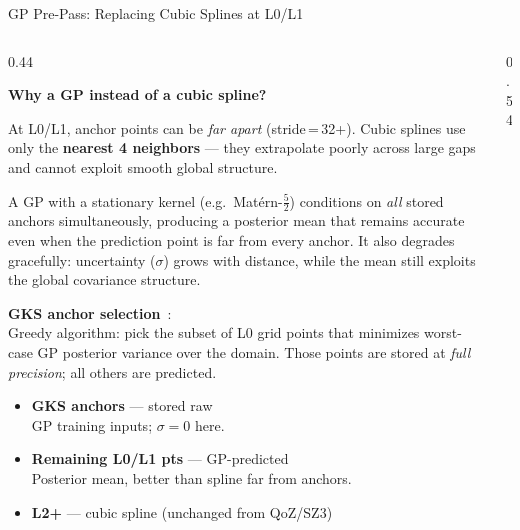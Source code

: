 \documentclass[aspectratio=169, 10pt]{beamer}
\begin{document}
\begin{frame}{GP Pre-Pass: Replacing Cubic Splines at L0/L1}

\begin{columns}[T, totalwidth=\textwidth]
\begin{column}{0.44\textwidth}
  {\footnotesize
  \textbf{Why a GP instead of a cubic spline?}\\[2pt]
  {\scriptsize
  At L0/L1, anchor points can be \emph{far apart} (stride\,=\,32+).
  Cubic splines use only the \textbf{nearest 4 neighbors} — they
  extrapolate poorly across large gaps and cannot exploit smooth
  global structure.

  A GP with a stationary kernel (e.g.\ Matérn-$\tfrac{5}{2}$)
  conditions on \emph{all} stored anchors simultaneously, producing
  a posterior mean that remains accurate even when the prediction
  point is far from every anchor.  It also degrades gracefully:
  uncertainty ($\sigma$) grows with distance, while the mean
  still exploits the global covariance structure.}

  \medskip
  \textbf{GKS anchor selection}~\cite{GKS}:\\[2pt]
  {\scriptsize Greedy algorithm: pick the subset of L0 grid points
  that minimizes worst-case GP posterior variance over the domain.
  Those points are stored at \emph{full precision}; all others
  are predicted.}

  \medskip
  \begin{itemize}\setlength\itemsep{2pt}
    \item[\textcolor{camber}{\textbullet}]
      \textbf{GKS anchors} — stored raw\\
      {\scriptsize GP training inputs; $\sigma\!=\!0$ here.}
    \item[\textcolor{cmint}{\textbullet}]
      \textbf{Remaining L0/L1 pts} — GP-predicted\\
      {\scriptsize Posterior mean, better than spline far from anchors.}
    \item[\textcolor{cmid!80}{\textbullet}]
      \textbf{L2+} — cubic spline (unchanged from QoZ/SZ3)
  \end{itemize}
  }
\end{column}

\begin{column}{0.54\textwidth}
\centering
{}
\end{column}
\end{columns}
\end{frame}
\end{document}
